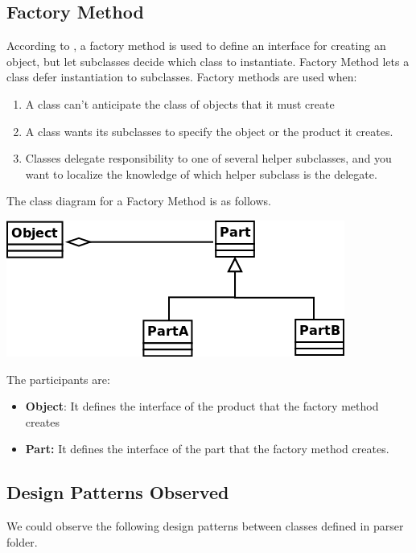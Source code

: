 \documentclass[oneside]{book}
\begin{document}
\subsection{Factory Method}
According to \cite{gamma1994}, a factory method is used to define an interface for creating an object, but let subclasses decide which class to instantiate. Factory Method lets a
class defer instantiation to subclasses.
 Factory methods are used when:
 \begin{enumerate}
 \item A class can't anticipate the class of objects that it must create
 \item A class wants its subclasses to specify the object or the product it creates.
 \item Classes delegate responsibility to one of several helper subclasses, and you want to localize the knowledge of
which helper subclass is the delegate.
 \end{enumerate}
 
 The class diagram for a Factory Method is as follows.
 \begin{center}
 \includegraphics[scale=0.5]{FactoryMethod.png}
 \end{center}
 
 The participants are:
 \begin{itemize}
 \item \textbf{Object}: It defines the interface of the product that the factory method creates
 \item \textbf{Part:} It defines the interface of the part that the factory method creates.

 \end{itemize}

\subsection{Design Patterns Observed}

We could observe the following design patterns between classes defined in parser folder.
\end{document}
